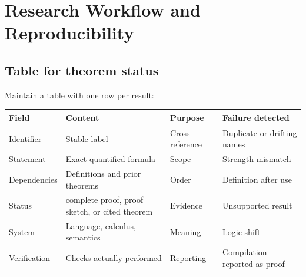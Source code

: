 \chapter{Research Workflow and Reproducibility}
\label{ch:research-workflow}

\section{Table for theorem status}
\label{sec:research-workflow-01}

Maintain a table with one row per result:
\begin{longtable}{@{}p{}p{}p{}p{}@{}}
\toprule
Field & Content & Purpose & Failure detected \\
\midrule
\endhead
Identifier & Stable label & Cross-reference & Duplicate or drifting names \\
Statement & Exact quantified formula & Scope & Strength mismatch \\
Dependencies & Definitions and prior theorems & Order & Definition after use \\
Status & complete proof, proof sketch, or cited theorem & Evidence & Unsupported result \\
System & Language, calculus, semantics & Meaning & Logic shift \\
Verification & Checks actually performed & Reporting & Compilation reported as proof \\
\bottomrule
\end{longtable}

